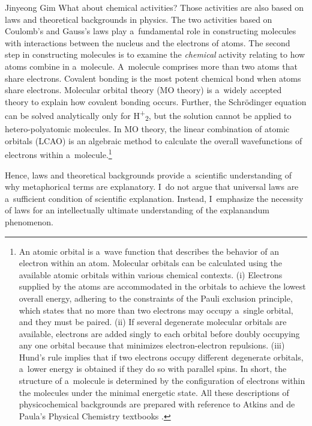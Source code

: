 \begin{artengenv}{Jinyeong Gim}
What about chemical activities? Those activities are also based on laws and theoretical backgrounds in physics. The two activities based on Coulomb's and Gauss's laws play a~fundamental role in constructing molecules with interactions between the nucleus and the electrons of atoms. The second step in constructing molecules is to examine the \textit{chemical} activity relating to how atoms combine in a~molecule. A~molecule comprises more than two atoms that share electrons. Covalent bonding is the most potent chemical bond when atoms share electrons. Molecular orbital theory (MO theory) is a~widely accepted theory to explain how covalent bonding occurs. Further, the Schrödinger equation can be solved analytically only for H\textsuperscript{+}\textsubscript{2}, but the solution cannot be applied to hetero-polyatomic molecules. In MO theory, the linear combination of atomic orbitals (LCAO) is an algebraic method to calculate the overall wavefunctions of electrons within a~molecule.\footnote{An atomic orbital is a~wave function that describes the behavior of an electron within an atom. Molecular orbitals can be calculated using the available atomic orbitals within various chemical contexts. (i) Electrons supplied by the atoms are accommodated in the orbitals to achieve the lowest overall energy, adhering to the constraints of the Pauli exclusion principle, which states that no more than two electrons may occupy a~single orbital, and they must be paired. (ii) If several degenerate molecular orbitals are available, electrons are added singly to each orbital before doubly occupying any one orbital because that minimizes electron-electron repulsions. (iii) Hund's rule implies that if two electrons occupy different degenerate orbitals, a~lower energy is obtained if they do so with parallel spins. In short, the structure of a~molecule is determined by the configuration of electrons within the molecules under the minimal energetic state. All these descriptions of physicochemical backgrounds are prepared with reference to Atkins and de Paula's Physical Chemistry textbooks
\parencite[see][]{atkins_physical_2014}.%
}

Hence, laws and theoretical backgrounds provide a~scientific understanding of why metaphorical terms are explanatory. I~do not argue that universal laws are a~sufficient condition of scientific explanation. Instead, I~emphasize the necessity of laws for an intellectually ultimate understanding of the explanandum phenomenon.


\end{artengenv}
